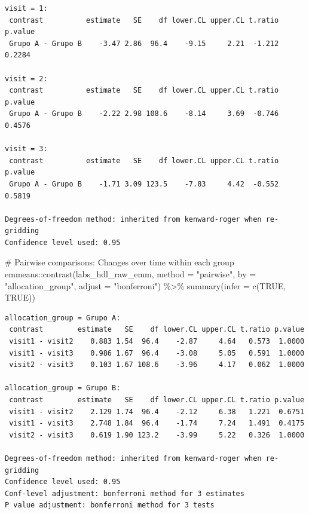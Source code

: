 \documentclass[
  letterpaper,
  DIV=11,
  numbers=noendperiod]{scrartcl}
\newenvironment{Shaded}{\begin{snugshade}}{\end{snugshade}}
\newcommand{\AttributeTok}[1]{\textcolor[rgb]{0.40,0.45,0.13}{#1}}
\newcommand{\CommentTok}[1]{\textcolor[rgb]{0.37,0.37,0.37}{#1}}
\newcommand{\ConstantTok}[1]{\textcolor[rgb]{0.56,0.35,0.01}{#1}}
\newcommand{\FunctionTok}[1]{\textcolor[rgb]{0.28,0.35,0.67}{#1}}
\newcommand{\NormalTok}[1]{\textcolor[rgb]{0.00,0.23,0.31}{#1}}
\newcommand{\SpecialCharTok}[1]{\textcolor[rgb]{0.37,0.37,0.37}{#1}}
\newcommand{\StringTok}[1]{\textcolor[rgb]{0.13,0.47,0.30}{#1}}
\begin{document}
\begin{verbatim}
visit = 1:
 contrast          estimate   SE    df lower.CL upper.CL t.ratio p.value
 Grupo A - Grupo B    -3.47 2.86  96.4    -9.15     2.21  -1.212  0.2284

visit = 2:
 contrast          estimate   SE    df lower.CL upper.CL t.ratio p.value
 Grupo A - Grupo B    -2.22 2.98 108.6    -8.14     3.69  -0.746  0.4576

visit = 3:
 contrast          estimate   SE    df lower.CL upper.CL t.ratio p.value
 Grupo A - Grupo B    -1.71 3.09 123.5    -7.83     4.42  -0.552  0.5819

Degrees-of-freedom method: inherited from kenward-roger when re-gridding 
Confidence level used: 0.95 
\end{verbatim}

\begin{Shaded}
\begin{Highlighting}[]
\CommentTok{\# Pairwise comparisons: Changes over time within each group}
\NormalTok{emmeans}\SpecialCharTok{::}\FunctionTok{contrast}\NormalTok{(labs\_hdl\_raw\_emm, }\AttributeTok{method =} \StringTok{"pairwise"}\NormalTok{, }\AttributeTok{by =} \StringTok{"allocation\_group"}\NormalTok{, }\AttributeTok{adjust =} \StringTok{"bonferroni"}\NormalTok{) }\SpecialCharTok{\%\textgreater{}\%} \FunctionTok{summary}\NormalTok{(}\AttributeTok{infer =} \FunctionTok{c}\NormalTok{(}\ConstantTok{TRUE}\NormalTok{, }\ConstantTok{TRUE}\NormalTok{))}
\end{Highlighting}
\end{Shaded}

\begin{verbatim}
allocation_group = Grupo A:
 contrast        estimate   SE    df lower.CL upper.CL t.ratio p.value
 visit1 - visit2    0.883 1.54  96.4    -2.87     4.64   0.573  1.0000
 visit1 - visit3    0.986 1.67  96.4    -3.08     5.05   0.591  1.0000
 visit2 - visit3    0.103 1.67 108.6    -3.96     4.17   0.062  1.0000

allocation_group = Grupo B:
 contrast        estimate   SE    df lower.CL upper.CL t.ratio p.value
 visit1 - visit2    2.129 1.74  96.4    -2.12     6.38   1.221  0.6751
 visit1 - visit3    2.748 1.84  96.4    -1.74     7.24   1.491  0.4175
 visit2 - visit3    0.619 1.90 123.2    -3.99     5.22   0.326  1.0000

Degrees-of-freedom method: inherited from kenward-roger when re-gridding 
Confidence level used: 0.95 
Conf-level adjustment: bonferroni method for 3 estimates 
P value adjustment: bonferroni method for 3 tests 
\end{verbatim}
\end{document}
